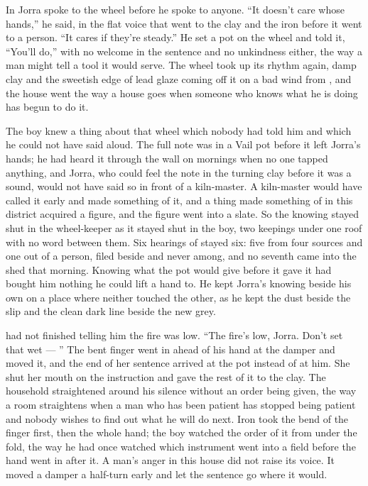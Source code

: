 In  Jorra spoke to the wheel before he spoke to anyone. “It doesn't care whose hands,” he said, in the flat voice that went to the clay and the iron before it went to a person. “It cares if they're steady.” He set a pot on the wheel and told it, “You'll do,” with no welcome in the sentence and no unkindness either, the way a man might tell a tool it would serve. The wheel took up its rhythm again, damp clay and the sweetish edge of lead glaze coming off it on a bad wind from , and the house went the way a house goes when someone who knows what he is doing has begun to do it.

The boy knew a thing about that wheel which nobody had told him and which he could not have said aloud. The full note was in a Vail pot before it left Jorra's hands; he had heard it through the wall on mornings when no one tapped anything, and Jorra, who could feel the note in the turning clay before it was a sound, would not have said so in front of a kiln-master. A kiln-master would have called it early and made something of it, and a thing made something of in this district acquired a figure, and the figure went into a slate. So the knowing stayed shut in the wheel-keeper as it stayed shut in the boy, two keepings under one roof with no word between them. Six hearings of  stayed six: five from four sources and one out of a person, filed beside and never among, and no seventh came into the shed that morning. Knowing what the pot would give before it gave it had bought him nothing he could lift a hand to. He kept Jorra's knowing beside his own on a place where neither touched the other, as he kept the dust beside the slip and the clean dark line beside the new grey.

 had not finished telling him the fire was low. “The fire's low, Jorra. Don't set that wet --- ” The bent finger went in ahead of his hand at the damper and moved it, and the end of her sentence arrived at the pot instead of at him. She shut her mouth on the instruction and gave the rest of it to the clay. The household straightened around his silence without an order being given, the way a room straightens when a man who has been patient has stopped being patient and nobody wishes to find out what he will do next. Iron took the bend of the finger first, then the whole hand; the boy watched the order of it from under the fold, the way he had once watched which instrument went into a field before the hand went in after it. A man's anger in this house did not raise its voice. It moved a damper a half-turn early and let the sentence go where it would.

